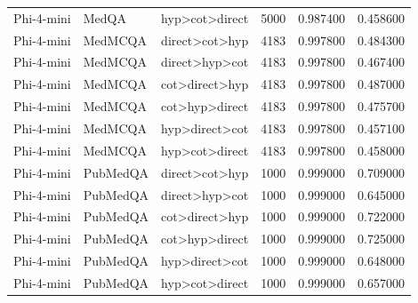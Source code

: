 \begin{tabular}{lllrrr}
Phi-4-mini & MedQA & hyp>cot>direct & 5000 & 0.987400 & 0.458600 \\
Phi-4-mini & MedMCQA & direct>cot>hyp & 4183 & 0.997800 & 0.484300 \\
Phi-4-mini & MedMCQA & direct>hyp>cot & 4183 & 0.997800 & 0.467400 \\
Phi-4-mini & MedMCQA & cot>direct>hyp & 4183 & 0.997800 & 0.487000 \\
Phi-4-mini & MedMCQA & cot>hyp>direct & 4183 & 0.997800 & 0.475700 \\
Phi-4-mini & MedMCQA & hyp>direct>cot & 4183 & 0.997800 & 0.457100 \\
Phi-4-mini & MedMCQA & hyp>cot>direct & 4183 & 0.997800 & 0.458000 \\
Phi-4-mini & PubMedQA & direct>cot>hyp & 1000 & 0.999000 & 0.709000 \\
Phi-4-mini & PubMedQA & direct>hyp>cot & 1000 & 0.999000 & 0.645000 \\
Phi-4-mini & PubMedQA & cot>direct>hyp & 1000 & 0.999000 & 0.722000 \\
Phi-4-mini & PubMedQA & cot>hyp>direct & 1000 & 0.999000 & 0.725000 \\
Phi-4-mini & PubMedQA & hyp>direct>cot & 1000 & 0.999000 & 0.648000 \\
Phi-4-mini & PubMedQA & hyp>cot>direct & 1000 & 0.999000 & 0.657000 \\
\bottomrule
\end{tabular}
